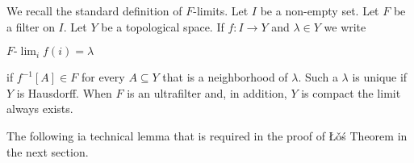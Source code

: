 \documentclass[12pt,letterpaper,oneside,reqno]{amsart}
\theoremstyle{plain}
\newtheorem{fact}[theorem]{Fact}
\theoremstyle{remark}
\begin{document}




We recall the standard definition of $F$-limits.
Let $I$ be a non-empty set.
Let $F$ be a filter on $I$.
Let $Y$ be a topological space.
If $f:I\to Y$ and $\lambda\in Y$ we write

\hfil$\displaystyle F\mbox{-}\lim_{i}f(i)=\lambda$

if $f^{-1}[A]\in F$ for every $A\subseteq Y$ that is a neighborhood of $\lambda$.
Such a $\lambda$ is unique if $Y$ is Hausdorff.
When $F$ is an ultrafilter and, in addition, $Y$ is compact the limit always exists.

The following ia technical lemma that is required in the proof of \L\v o\'s Theorem in the next section.
\end{document}
